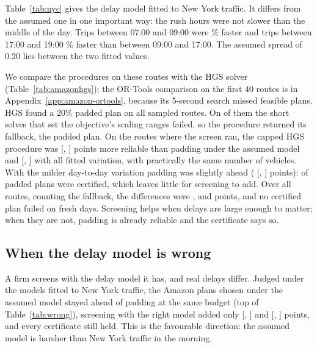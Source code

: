 \documentclass[11pt,a4paper]{article}
\theoremstyle{remark}
\begin{document}
Table~\ref{tab:nyc} gives the delay model fitted to New York traffic. It differs
from the assumed one in one important way: the rush hours were not slower than the
middle of the day. Trips between 07:00 and 09:00 were \NycAmFaster\% faster and
trips between 17:00 and 19:00 \NycPmFaster\% faster than between 09:00 and 17:00.
The assumed spread of 0.20 lies between the two fitted values.



We compare the procedures on these routes with the HGS solver
(Table~\ref{tab:amazonhgs}); the OR-Tools comparison on the first 40 routes is in
Appendix~\ref{app:amazon-ortools}, because its 5-second search missed feasible plans.
HGS found a 20\% padded plan on all \AmzHRoutes{} sampled routes. On \AmzHNotRun{} of them
the short solves that set the objective's scaling ranges failed, so the procedure
returned its fallback, the padded plan. On the \AmzHBoth{} routes where the screen ran,
the capped HGS procedure was \AmzHBothDiff{} [\AmzHBothDiffLo, \AmzHBothDiffHi] points more
reliable than padding under the assumed model and \AmzHTBothDiff{} [\AmzHTBothDiffLo,
\AmzHTBothDiffHi] with all fitted variation, with practically the same number of
vehicles. With the milder day-to-day variation padding was slightly ahead
(\AmzHDBothDiff{} [\AmzHDBothDiffLo, \AmzHDBothDiffHi] points): \AmzHDCertPad{} of
\AmzHPadPlans{} padded plans were certified, which leaves little for screening to add.
Over all routes, counting the fallback, the differences were \AmzHFbDiff, \AmzHDFbDiff{}
and \AmzHTFbDiff{} points, and no certified plan failed on fresh days. Screening helps
when delays are large enough to matter; when they are not, padding is already reliable
and the certificate says so.



\subsection{When the delay model is wrong}\label{sec:wrong}

A firm screens with the delay model it has, and real delays differ. Judged under the
models fitted to New York traffic, the Amazon plans chosen under the assumed model
stayed ahead of padding at the same budget (top of Table~\ref{tab:wrong}), screening
with the right model added only \WrDGain{} [\WrDGainLo, \WrDGainHi] and \WrTGain{}
[\WrTGainLo, \WrTGainHi] points, and every certificate still held. This is the
favourable direction: the assumed model is harsher than New York traffic in the
morning.
\end{document}

